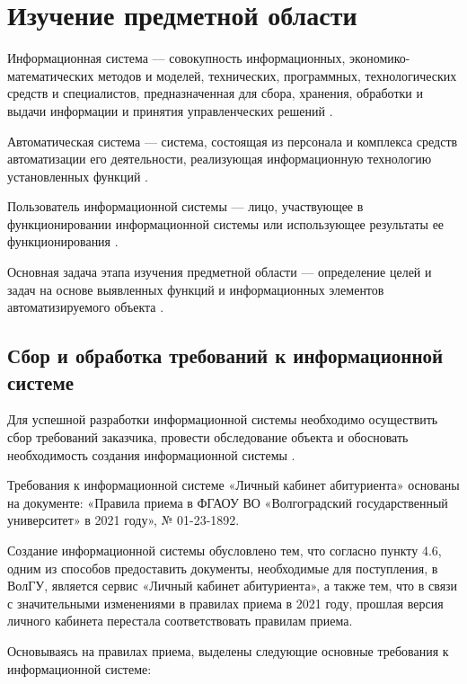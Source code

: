 \chapter{Изучение предметной области}

Информационная система — совокупность информационных, экономико-математических методов и моделей, технических, программных, технологических средств и специалистов, предназначенная для сбора, хранения, обработки и выдачи информации и принятия управленческих решений \cite{devinfsystem}.

Автоматическая система — система, состоящая из персонала и комплекса средств автоматизации его деятельности, реализующая информационную технологию установленных функций \cite{methdoinfsystem}.

Пользователь информационной системы — лицо, участвующее в функционировании информационной системы или использующее результаты ее функционирования \cite{infsystem}.

Основная задача этапа изучения предметной области — определение целей и задач на основе выявленных функций и информационных элементов автоматизируемого объекта \cite{exploitinfsystem}. 


\section{Сбор и обработка требований к информационной системе}

Для успешной разработки информационной системы необходимо осуществить сбор требований заказчика, провести обследование объекта и обосновать необходимость создания информационной системы \cite{highinfsystem}.

Требования к информационной системе «Личный кабинет абитуриента» основаны на документе: «Правила приема в ФГАОУ ВО «Волгоградский государственный университет» в 2021 году», № 01-23-1892.

Создание информационной системы обусловлено тем, что согласно пункту 4.6, одним из способов предоставить документы, необходимые для поступления, в ВолГУ, является сервис «Личный кабинет абитуриента», а также тем, что в связи с значительными изменениями в правилах приема в 2021 году, прошлая версия личного кабинета перестала соответствовать правилам приема.

Основываясь на правилах приема, выделены следующие основные требования к информационной системе:

